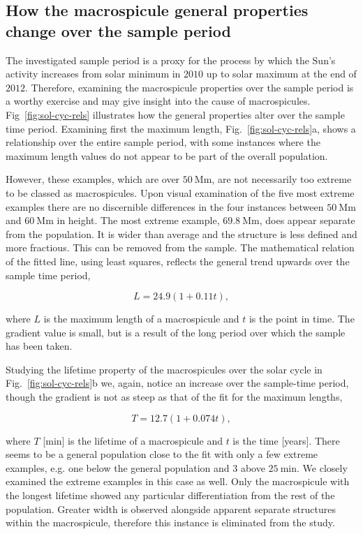 \subsection{How the macrospicule general properties change over the sample period}
The investigated sample period is a proxy for the process by which the Sun's activity increases from solar minimum in $2010$ up to solar maximum at the end of $2012$. Therefore, examining the macrospicule properties over the sample period is a worthy exercise and may give insight into the cause of macrospicules. Fig~\ref{fig:sol-cyc-rels} illustrates how the general properties alter over the sample time period. Examining first the maximum length, Fig.~\ref{fig:sol-cyc-rels}a, shows a relationship over the entire sample period, with some instances where the maximum length values do not appear to be part of the overall population. 

However, these examples, which are over $50\ \textrm{Mm}$, are not necessarily too extreme to be classed as macrospicules. Upon visual examination of the five most extreme examples there are no discernible differences in the four instances between $50\ \textrm{Mm}$ and $60\ \textrm{Mm}$ in height. The most extreme example, $69.8\ \textrm{Mm}$, does appear separate from the population. It is wider than average and the structure is less defined and more fractious. This can be removed from the sample. The mathematical relation of the fitted line, using least squares, reflects the general trend upwards over the sample time period, 

\begin{equation}
L = 24.9(1 + 0.11t),
\end{equation}

\noindent where $L$ is the maximum length of a macrospicule and $t$ is the point in time. The gradient value is small, but is a result of the long period over which the sample has been taken.

Studying the lifetime property of the macrospicules over the solar cycle in Fig.~\ref{fig:sol-cyc-rels}b we, again, notice an increase over the sample-time period, though the gradient is not as steep as that of the fit for the maximum lengths, 

\begin{equation}
T = 12.7(1 + 0.074t),
\end{equation}

\noindent where $T$ [min] is the lifetime of a macrospicule and $t$ is the time [years]. There seems to be a general population close to the fit with only a few extreme examples, e.g. one below the general population and 3 above $25\ \textrm{min}$. We closely examined the extreme examples in this case as well. Only the macrospicule with the longest lifetime showed any particular differentiation from the rest of the population. Greater width is observed alongside apparent separate structures within the macrospicule, therefore this instance is eliminated from the study.

